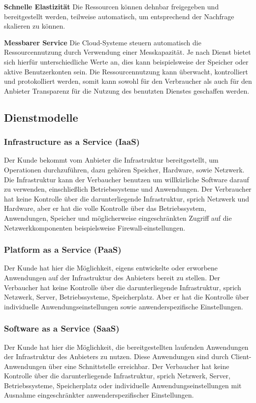 \textbf{Schnelle Elastizität}
Die Ressourcen können dehnbar freigegeben und bereitgestellt werden, teilweise automatisch, um entsprechend der Nachfrage skalieren zu können\cite{nist_definition}.

\textbf{Messbarer Service}
Die Cloud-Systeme steuern automatisch die Ressourcennutzung durch Verwendung einer Messkapazität. Je nach Dienst bietet sich hierfür unterschiedliche Werte an, dies kann beispielsweise der Speicher oder aktive Benutzerkonten sein. Die Ressourcennutzung kann überwacht, kontrolliert und protokolliert werden, somit kann sowohl für den Verbraucher als auch für den Anbieter Transparenz für die Nutzung des benutzten Dienstes geschaffen werden\cite{nist_definition}.


\subsection{Dienstmodelle}
\subsubsection{Infrastructure as a Service (IaaS)} \label{IaaS}
Der Kunde bekommt vom Anbieter die Infrastruktur bereitgestellt, um Operationen durchzuführen, dazu gehören Speicher, Hardware, sowie Netzwerk. Die Infrastruktur kann der Verbaucher benutzen um willkürliche Software darauf zu verwenden, einschließlich Betriebssysteme und Anwendungen. Der Verbraucher hat keine Kontrolle über die darunterliegende Infrastruktur, sprich Netzwerk und Hardware, aber er hat die volle Kontrolle über das Betriebssystem, Anwendungen, Speicher und möglicherweise eingeschränkten Zugriff auf die Netzwerkkomponenten beispielsweise Firewall-einstellungen\cite{nist_definition}.

\subsubsection{Platform as a Service (PaaS)} \label{PaaS} 
Der Kunde hat hier die Möglichkeit, eigens entwickelte oder erworbene Anwendungen auf der Infrastruktur des Anbieters bereit zu stellen. Der Verbaucher hat keine Kontrolle über die darunterliegende Infrastruktur, sprich Netzwerk, Server, Betriebssysteme, Speicherplatz. Aber er hat die Kontrolle über individuelle Anwendungseinstellungen sowie anwenderspezifische Einstellungen\cite{nist_definition}.

\subsubsection{Software as a Service (SaaS)} \label{SaaS}
Der Kunde hat hier die Möglichkeit, die bereitgestellten laufenden Anwendungen der Infrastruktur des Anbieters zu nutzen. Diese Anwendungen sind durch Client-Anwendungen über eine Schnittstelle erreichbar. Der Verbaucher hat keine Kontrolle über die darunterliegende Infrastruktur, sprich Netzwerk, Server, Betriebssysteme, Speicherplatz oder individuelle Anwendungseinstellungen mit Ausnahme eingeschränkter anwenderspezifischer Einstellungen\cite{nist_definition}.

